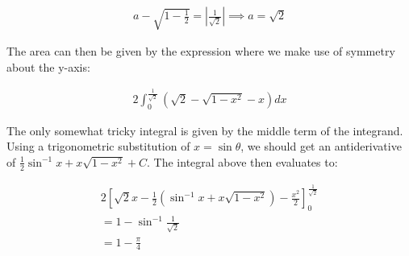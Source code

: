 \begin{enumerate}
\begin{enumerate}
	    \begin{align*}
	        a - \sqrt{1 - \frac{1}{2}} = \left|\frac{1}{\sqrt{2}}\right| \implies a = \sqrt{2}
	    \end{align*}
	    
	    The area can then be given by the expression where we make use of symmetry about the y-axis:
	    
	    \begin{align*}
	        2\int_0^\frac{1}{\sqrt{2}}\left(\sqrt{2} - \sqrt{1 - x^2} - x\right)dx
	    \end{align*}
	    
	    The only somewhat tricky integral is given by the middle term of the integrand. Using a trigonometric substitution of $x = \sin\theta$, we should get an antiderivative of $\frac{1}{2}\sin^{-1}x + x\sqrt{1-x^2} + C$. The integral above then evaluates to:
	    
	    \begin{align*}
	        2\left[\sqrt{2}x - \frac{1}{2}\left(\sin^{-1}x + x\sqrt{1-x^2}\right) - \frac{x^2}{2}\right]_0^\frac{1}{\sqrt{2}} \\ 
	        = 1 - \sin^{-1}\frac{1}{\sqrt{2}} \\ 
	        = 1 - \frac{\pi}{4}
	    \end{align*}
\end{enumerate}


\end{enumerate}
